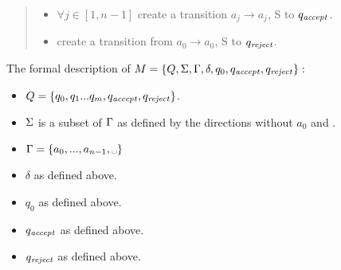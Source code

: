 {\begin{quote}
\begin{enumerate}
    \begin{itemize}
        \item $\forall j \in [1,n-1]$ create a transition $a_{j} \rightarrow a_{j}$, S to $q_{\text{\emph{accept}}}$.
        \item create a transition from $a_0 \rightarrow a_0$, S to $q_{\text{\emph{reject}}}$.
    \end{itemize}
\end{enumerate}
\end{quote}
The formal description of $M = \{Q, \Sigma, \Gamma, \delta, q_0,q_{\text{\emph{accept}}}, q_{\text{\emph{reject}}}\}:$
\begin{itemize}
    \item $Q = \{q_0,q_1...q_m,q_{\text{\emph{accept}}}, q_{\text{\emph{reject}}}\}$.
    \item $\Sigma$ is a subset of $\Gamma$ as defined by the directions without $a_0$ and \spc.
    \item $\g = \{a_0,...,a_{n-1},\text{\spc}\}$
    \item $\delta$ as defined above.
    \item $q_0$ as defined above.
    \item $q_{\text{\emph{accept}}}$ as defined above.
    \item $q_{\text{\emph{reject}}}$ as defined above.
\end{itemize}
}